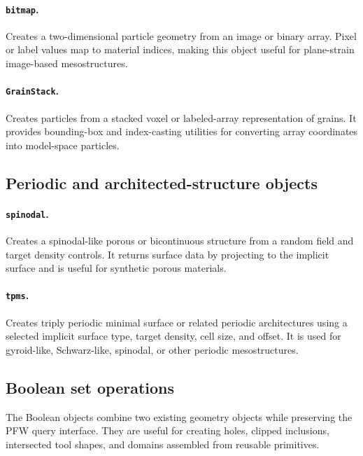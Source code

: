 \paragraph{\texttt{bitmap}.}Creates a two-dimensional particle geometry from an image or binary array.  Pixel or label values map to material indices, making this object useful for plane-strain image-based mesostructures.

\paragraph{\texttt{GrainStack}.}Creates particles from a stacked voxel or labeled-array representation of grains.  It provides bounding-box and index-casting utilities for converting array coordinates into model-space particles.

\subsection{Periodic and architected-structure objects}

\paragraph{\texttt{spinodal}.}Creates a spinodal-like porous or bicontinuous structure from a random field and target density controls.  It returns surface data by projecting to the implicit surface and is useful for synthetic porous materials.

\paragraph{\texttt{tpms}.}Creates triply periodic minimal surface or related periodic architectures using a selected implicit surface type, target density, cell size, and offset.  It is used for gyroid-like, Schwarz-like, spinodal, or other periodic mesostructures.

\subsection{Boolean set operations}

The Boolean objects combine two existing geometry objects while preserving the PFW query interface.  They are useful for creating holes, clipped inclusions, intersected tool shapes, and domains assembled from reusable primitives.

